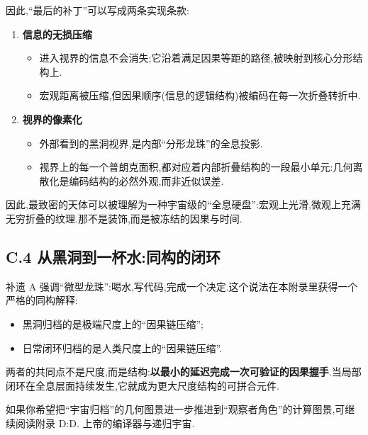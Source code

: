 因此,``最后的补丁''可以写成两条实现条款:

\begin{enumerate}
\item \textbf{信息的无损压缩}
\begin{itemize}
\item 进入视界的信息不会消失;它沿着满足因果等距的路径,被映射到核心分形结构上.
\item 宏观距离被压缩,但因果顺序(信息的逻辑结构)被编码在每一次折叠转折中.
\end{itemize}
\item \textbf{视界的像素化}
\begin{itemize}
\item 外部看到的黑洞视界,是内部``分形龙珠''的全息投影.
\item 视界上的每一个普朗克面积,都对应着内部折叠结构的一段最小单元:几何离散化是编码结构的必然外观,而非近似误差.
\end{itemize}
\end{enumerate}

因此,最致密的天体可以被理解为一种宇宙级的``全息硬盘'':宏观上光滑,微观上充满无穷折叠的纹理.那不是装饰,而是被冻结的因果与时间.

\subsection*{C.4 从黑洞到一杯水:同构的闭环}

补遗 A 强调``微型龙珠'':喝水,写代码,完成一个决定.这个说法在本附录里获得一个严格的同构解释:

\begin{itemize}
\item 黑洞归档的是极端尺度上的``因果链压缩'';
\item 日常闭环归档的是人类尺度上的``因果链压缩''.
\end{itemize}

两者的共同点不是尺度,而是结构:\textbf{以最小的延迟完成一次可验证的因果握手}.当局部闭环在全息层面持续发生,它就成为更大尺度结构的可拼合元件.

如果你希望把``宇宙归档''的几何图景进一步推进到``观察者角色''的计算图景,可继续阅读附录 D:D. 上帝的编译器与递归宇宙.

